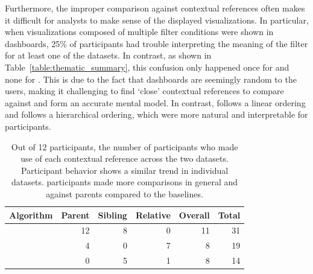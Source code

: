 \par Furthermore, the improper comparison against contextual references often makes it difficult for analysts to make sense of the displayed visualizations. In particular, when visualizations composed of multiple filter conditions were shown in \cluster dashboards, 25\% of participants had trouble interpreting the meaning of the filter for at least one of the datasets. In contrast, as shown in Table~\ref{table:thematic_summary}, this confusion only happened once for \BFS and none for \system. This is due to the fact that \cluster dashboards are seemingly random to the users, making it challenging to find `close' contextual references to compare against and form an accurate mental model. In contrast, \BFS follows a linear ordering and \system follows a hierarchical ordering, which were more natural and interpretable for participants. 
\begin{table}[h!]
\hspace{-10pt}
\centering
	\begin{tabular}{|l|rrrr|r|}
	\hline
	 \small{Algorithm}   &    \small{Parent} &   \small{Sibling} &   \small{Relative} & \small{Overall} &   \small{Total} \\
	\hline
	 \small{\system}     &    \cellcolor{blue!25} 12 &       8 &     0 &  11 &      \cellcolor{blue!25} 31 \\
	 \small{\cluster}     &         4 &        0 &         7 &          8 &      19 \\
	 \small{\BFS}         &         0 &        5 &         1 &          8 &      14 \\
	\hline
	\end{tabular}
\caption{Out of 12 participants, the number of participants who made use of each contextual reference across the two datasets. Participant behavior shows a similar trend in individual datasets. \system participants made more comparisons in general and against parents compared to the baselines.}
\label{table:contextualReferenceCount}
\end{table}
